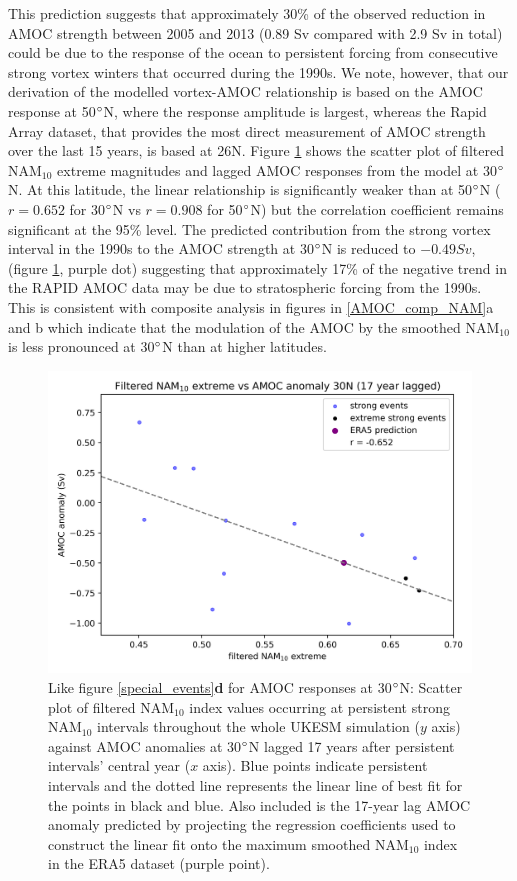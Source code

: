This prediction suggests that approximately 30\% of the observed reduction in AMOC strength  between 2005 and 2013 (0.89 Sv compared with 2.9 Sv in total) could be due to the response of the ocean to persistent forcing from consecutive strong vortex winters that occurred during the 1990s. We note, however, that our derivation of the modelled vortex-AMOC relationship is based on the AMOC response at 50$\degree$N, where the response amplitude is largest, whereas the Rapid Array dataset, that provides the most direct measurement of AMOC strength over the last 15 years, is based at 26N.  Figure \ref{special_events_30} shows the scatter plot of filtered NAM$_{10}$ extreme magnitudes and lagged AMOC responses from the model at 30$\degree$N. At this latitude, the linear relationship is significantly weaker than at 50$\degree$N ($r = 0.652$ for 30$\degree$N vs $r = 0.908$ for 50$\degree$N) but the correlation coefficient remains significant at the 95\% level. The predicted contribution from the strong vortex interval in the 1990s to the AMOC strength at 30$\degree$N is reduced to $-0.49Sv$,  (figure \ref{special_events_30}, purple dot) suggesting that  approximately 17\% of the negative trend in the RAPID AMOC data may be due to stratospheric forcing from the 1990s. This is consistent with composite analysis in figures in \ref{AMOC_comp_NAM}a and b which indicate that the modulation of the AMOC by the smoothed NAM$_{10}$ is less pronounced at 30$\degree$N than at higher latitudes.

\begin{figure}[h!]
\begin{center}
\noindent\includegraphics[width = 0.6\linewidth]{Figures/Figures-surface/AMOC_response_special_events_30N_AMOC.png} 
\caption[Regression of NAM$_{10}$ extreme magnitude vs AMOC anomaly at 30$\degree$N]{Like figure \ref{special_events}\textbf{d} for AMOC responses at 30$\degree$N: Scatter plot of filtered NAM$_{10}$ index values occurring at persistent strong NAM$_{10}$ intervals throughout the whole UKESM simulation ($y$ axis) against AMOC anomalies at 30$\degree$N lagged 17 years after persistent intervals' central year ($x$ axis). Blue points indicate persistent intervals and the dotted line represents the linear line of best fit for the points in black and blue. Also included is the 17-year lag AMOC anomaly predicted by projecting the regression coefficients used to construct the linear fit onto the maximum smoothed NAM$_{10}$ index in the ERA5 dataset (purple point).}
\label{special_events_30}
\end{center}
\end{figure}

